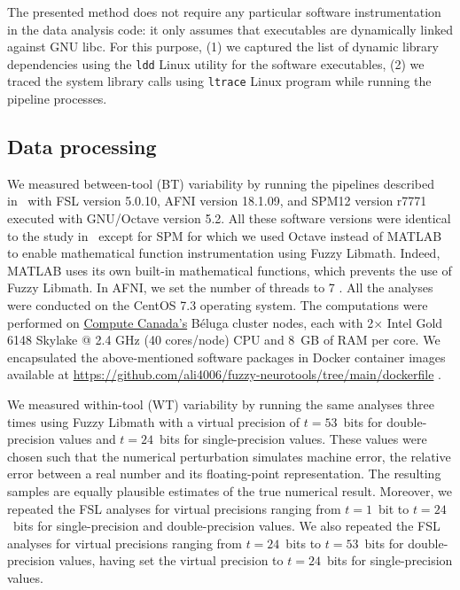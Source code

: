 \documentclass[conference]{IEEEtran}
\begin{document}
The presented method does not require any particular software
instrumentation in the data analysis code: it only assumes that executables
are dynamically linked against GNU libc. For this purpose, (1) we captured
the list of dynamic library dependencies using the \texttt{ldd} Linux
utility for the software executables, (2) we traced the system library
calls using \texttt{ltrace} Linux program while running the pipeline
processes.

\subsection{Data processing}

We measured between-tool (BT) variability by running the pipelines
described in~\cite{bowring2019exploring} with FSL version 5.0.10, AFNI
version 18.1.09, and SPM12 version r7771 executed with GNU/Octave version
5.2. All these software versions were identical to the study
in~\cite{bowring2019exploring} except for SPM for which we used Octave
instead of MATLAB to enable mathematical function instrumentation using
Fuzzy Libmath. Indeed, MATLAB uses its own built-in mathematical functions,
which prevents the use of Fuzzy Libmath. In AFNI, we set the number of
threads to 7 . All the
analyses were conducted on the CentOS 7.3 operating system. The
computations were performed on \href{https://www.computecanada.ca}{Compute
Canada's} Béluga cluster nodes, each with 2$\times$ Intel Gold 6148 Skylake
@ 2.4 GHz (40 cores/node) CPU and 8~GB of RAM per core. We encapsulated the
above-mentioned software packages in Docker container images available at
\url{https://github.com/ali4006/fuzzy-neurotools/tree/main/dockerfile}
.

We measured within-tool (WT) variability by running the same analyses three
times using Fuzzy Libmath with a virtual precision of $t=53$~bits for
double-precision values and $t=24$~bits for single-precision values. These
values were chosen such that the numerical perturbation simulates machine
error, the relative error between a real number and its floating-point
representation. The resulting samples are equally plausible estimates of
the true numerical result. Moreover, we repeated the FSL analyses for virtual
precisions ranging from $t=1$~bit to $t=24$~bits for single-precision
and double-precision values. We also repeated the FSL analyses for virtual 
precisions ranging from $t=24$~bits to $t=53$~bits for double-precision values, having 
set the virtual precision to $t=24$~bits for single-precision values. 
\end{document}
